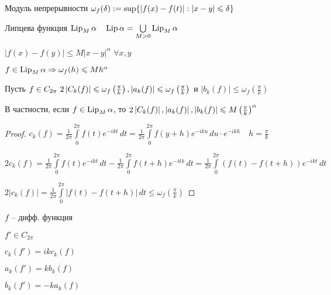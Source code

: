 \begin{reminder}\thmslashn

	Модуль непрерывности $\omega_f(\delta) := \sup\{\left|f(x) - f(t)\right| : |x - y| \leqslant \delta\}$
	
	Липцева функция $\operatorname{Lip}_{M} \alpha \quad \operatorname{Lip} \alpha = \bigcup\limits_{M > 0} \operatorname{Lip}_{M} \alpha$
	
	$|f(x) - f(y)| \leqslant M|x - y|^{\alpha} \,\,\forall x, y$

\end{reminder}


\begin{remark}\thmslashn

	$f \in \operatorname{Lip}_{M} \alpha \Rightarrow \omega_f(h) \leqslant Mh^{\alpha}$

\end{remark}

\begin{theorem}\thmslashn 

	Пусть $f\in C_{2\pi}\,\, 2\left|C_k(f)\right| \leqslant \omega_f\left(\frac{\pi}{k}\right), |a_k(f)| \leqslant \omega_f\left(\frac{\pi}{k}\right)$  и $|b_k(f)| \leqslant \omega_f\left(\frac{\pi}{k}\right)$
	
	В частности, если $f\in \operatorname{Lip}_{M} \alpha$, то $2\left|C_k(f)\right|, \left|a_k(f)\right|, \left|b_k(f)\right| \leqslant M\left(\frac{\pi}{k}\right)^\alpha$

\end{theorem}

\begin{proof}\thmslashn

	$c_k(f) = \frac{1}{2\pi}\int\limits_{0}^{2\pi} f(t) e^{-ikt}\,dt = \frac{1}{2\pi}\int\limits_{0}^{2\pi} f(y+h) e^{-iku}\,du \cdot e^{-ikh}\quad h = \frac{\pi}{k}$
	
	$2c_k(f) = \frac{1}{2\pi} \int\limits_{0}^{2\pi}f(t)e^{-ikt}\,dt - \frac{1}{2\pi}\int\limits_{0}^{2\pi}f(t + h) e^{-itk}\,dt = \frac{1}{2\pi} \int\limits_{0}^{2\pi} \left(f(t) - f(t + h)\right) e^{-ikt}\,dt$
	
	$2|c_k(f)| = \frac{1}{2\pi} \int\limits_{0}^{2\pi} \left|f(t) - f(t + h)\right|\,dt\leqslant \omega_f\left(\frac{\pi}{k}\right)$

\end{proof}

\begin{lemma}\thmslashn

	$f$ -- дифф. функция 
	
	$f' \in C_{2\pi}$
	
	$c_k(f') = ikc_k(f)$
	
	$a_k(f') = kb_k(f)$
	
	$b_k(f') = -ka_k(f)$

\end{lemma}

